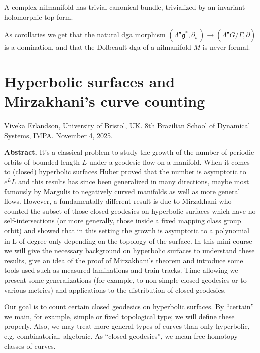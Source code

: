 \begin{theorem}
\label{theorem-bdv7}
A complex nilmanifold has trivial canonical
bundle,
trivialized by an invariant holomorphic top
form.
\end{theorem}

As corollaries we get that the natural dga
morphism
$(\Lambda^\bullet\mathfrak{g}^*,
\overline{\partial}_w)\to
(\Lambda^\bullet
G/\Gamma,\overline{\partial})$ is a
domination,
and that the Dolbeault dga of a nilmanifold
$M$ is never formal.






\section{Hyperbolic surfaces and Mirzakhani's
curve counting}
\label{section-hyper-surfa-mizak-curve}

\noindent
Viveka Erlandson, University of Bristol, UK.
8th Brazilian School of Dynamical Systems,
IMPA.
November 4, 2025.

\medskip\noindent
{\bf Abstract.}
It’s a classical problem to study the growth
of the number of periodic orbits of
bounded length $L$ under a geodesic flow on a
manifold. When it comes to
(closed) hyperbolic surfaces Huber proved
that the number is asymptotic to $e^L
L$ and this results has since been
generalized in many directions, maybe most
famously by Margulis to negatively curved
manifolds as well as more general
flows. However, a fundamentally different
result is due to Mirzakhani who
counted the subset of those closed geodesics
on hyperbolic surfaces which have
no self-intersections (or more generally,
those inside a fixed mapping class
group orbit) and showed that in this setting
the growth is asymptotic to a
polynomial in L of degree only depending on
the topology of the surface. In this
mini-course we will give the necessary
background on hyperbolic surfaces to
understand these results, give an idea of the
proof of Mirzakhani’s theorem and
introduce some tools used such as measured
laminations and train tracks. Time
allowing we present some generalizations (for
example, to non-simple closed
geodesics or to various metrics) and
applications to the distribution of closed
geodesics.

\medskip\noindent
Our goal is to count certain closed geodesics
on hyperbolic surfaces.
By ``certain'' we main, for example, simple
or fixed topological type;
we will define these properly. Also, we may
treat more general
types of curves than only hyperbolic, e.g.
combinatorial, algebraic.
As ``closed geodesics'', we mean free
homotopy classes of curves.

